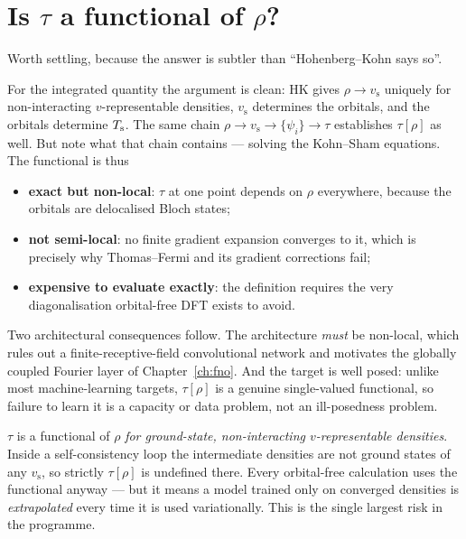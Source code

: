 \section{Is \texorpdfstring{$\tau$}{tau} a functional of \texorpdfstring{$\rho$}{rho}?}

Worth settling, because the answer is subtler than ``Hohenberg--Kohn says so''.

For the integrated quantity the argument is clean: HK gives $\rho\to
v_{\mathrm{s}}$ uniquely for non-interacting $v$-representable densities,
$v_{\mathrm{s}}$ determines the orbitals, and the orbitals determine $T_{\mathrm{s}}$. The
same chain $\rho\to v_{\mathrm{s}}\to\{\psi_i\}\to\tau$ establishes
$\tau[\rho]$ as well. But note what that chain contains --- solving the
Kohn--Sham equations. The functional is thus

\begin{itemize}
  \item \textbf{exact but non-local}: $\tau$ at one point depends on $\rho$
    everywhere, because the orbitals are delocalised Bloch states;
  \item \textbf{not semi-local}: no finite gradient expansion converges to it,
    which is precisely why Thomas--Fermi and its gradient corrections fail;
  \item \textbf{expensive to evaluate exactly}: the definition requires the very
    diagonalisation orbital-free DFT exists to avoid.
\end{itemize}

Two architectural consequences follow. The architecture \emph{must} be
non-local, which rules out a finite-receptive-field convolutional network and
motivates the globally coupled Fourier layer of Chapter~\ref{ch:fno}. And the
target is well posed: unlike most machine-learning targets, $\tau[\rho]$ is a
genuine single-valued functional, so failure to learn it is a capacity or data
problem, not an ill-posedness problem.

\begin{pwarn}
$\tau$ is a functional of $\rho$ \emph{for ground-state, non-interacting
$v$-representable densities}. Inside a self-consistency loop the intermediate
densities are not ground states of any $v_{\mathrm{s}}$, so strictly
$\tau[\rho]$ is undefined there. Every orbital-free calculation uses the
functional anyway --- but it means a model trained only on converged densities
is \emph{extrapolated} every time it is used variationally. This is the single
largest risk in the programme.
\end{pwarn}

